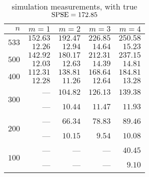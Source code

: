 \begin{table}[htb]
	\center
	\caption{simulation measurements, with true $\mathrm{SPSE} = 172.85$}
	\label{tab:}
	\begin{tabular}{rrrrr}
		\hline
		$n$ & $m=1$ & $m=2$ & $m=3$ & $m=4$ \\
		\hline
		\hline
		\multirow{2}{*}{$533$}
		& $152.63$ & $192.47$ & $226.85$ & $250.58$ \\
		& $12.26$ & $12.94$ & $14.64$ & $15.23$ \\
		\hline
		\multirow{2}{*}{$500$}
		& $142.92$ & $180.17$ & $212.31$ & $237.15$ \\
		& $12.03$ & $12.63$ & $14.39$ & $14.81$ \\
		\hline
		\multirow{2}{*}{$400$}
		& $112.31$ & $138.81$ & $168.64$ & $184.81$ \\
		& $12.28$ & $11.26$ & $12.64$ & $13.28$ \\
		\hline
		\multirow{2}{*}{$300$}
		& --- & $104.82$ & $126.13$ & $139.38$ \\
		& --- & $10.44$ & $11.47$ & $11.93$ \\
		\hline
		\multirow{2}{*}{$200$}
		& --- & $66.34$ & $78.83$ & $89.46$ \\
		& --- & $10.15$ & $9.54$ & $10.08$ \\
		\hline
		\multirow{2}{*}{$100$}
		& --- & --- & --- & $40.45$ \\
		& --- & --- & --- & $9.10$ \\
		\hline
	\end{tabular}
\end{table}